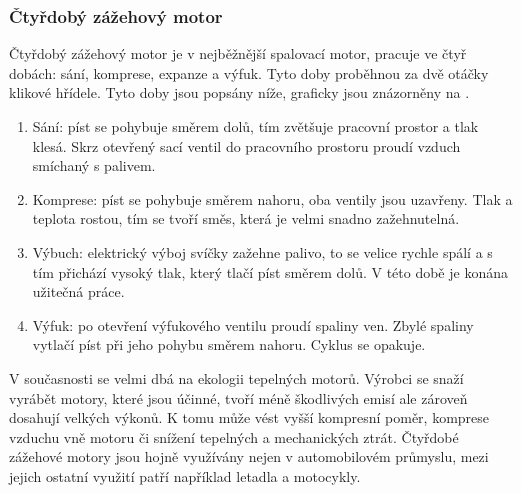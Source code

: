 \subsubsection{Čtyřdobý zážehový motor}
{Čtyřdobý zážehový motor je v nejběžnější spalovací motor, pracuje ve čtyř dobách: sání, komprese, expanze a výfuk. Tyto doby proběhnou za dvě otáčky klikové hřídele. Tyto doby jsou popsány níže, graficky jsou znázorněny na .}
\cite{ZUP:CtyrdobyAtmosferickyZazehovyMotor}
\begin{enumerate}
    \item {Sání: píst se pohybuje směrem dolů, tím zvětšuje pracovní prostor a tlak klesá. Skrz otevřený sací ventil do pracovního prostoru proudí vzduch smíchaný s palivem.}
    \item {Komprese: píst se pohybuje směrem nahoru, oba ventily jsou uzavřeny. Tlak a teplota rostou, tím se tvoří směs, která je velmi snadno zažehnutelná.}
    \item {Výbuch: elektrický výboj svíčky zažehne palivo, to se velice rychle spálí a s tím přichází vysoký tlak, který tlačí píst směrem dolů. V této době je konána užitečná práce.}
    \item {Výfuk: po otevření výfukového ventilu proudí spaliny ven. Zbylé spaliny vytlačí píst při jeho pohybu směrem nahoru. Cyklus se opakuje.}
\end{enumerate}
{V současnosti se velmi dbá na ekologii tepelných motorů. Výrobci se snaží vyrábět motory, které jsou účinné, tvoří méně škodlivých emisí ale zároveň dosahují velkých výkonů. K tomu může vést vyšší kompresní poměr, komprese vzduchu vně motoru či snížení tepelných a mechanických ztrát.}
\cite{ZUP:CtyrdobyAtmosferickyZazehovyMotor}\odst
{Čtyřdobé zážehové motory jsou hojně využívány nejen v automobilovém průmyslu, mezi jejich ostatní využití patří například letadla a motocykly.}
